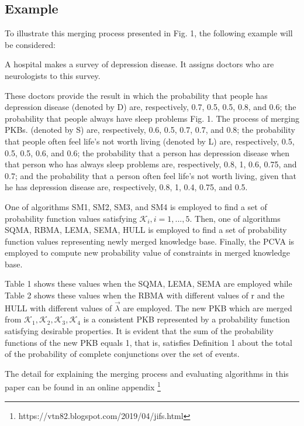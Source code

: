 \documentclass[]{iosart2c}
\begin{document}
\subsection{Example}

To illustrate this merging process presented in Fig. 1, the following example will be considered: 

A hospital makes a survey of depression disease. It assigns doctors who are neurologists to this survey. 

These doctors provide the result in which the probability that people has depression disease (denoted by D) are, respectively, 0.7, 0.5, 0.5, 0.8, and 0.6; the probability that people always have sleep problems Fig. 1. The process of merging PKBs.
(denoted by S) are, respectively, 0.6, 0.5, 0.7, 0.7, and 0.8; the probability that people often feel life’s not worth living (denoted by L) are, respectively, 0.5, 0.5, 0.5, 0.6, and 0.6; the probability that a person has depression disease when that person who has always sleep problems are, respectively, 0.8, 1, 0.6, 0.75, and 0.7; and the probability that a person often feel life’s not worth living, given that he has depression disease are, respectively, 0.8, 1, 0.4, 0.75, and 0.5. 

One of algorithms SM1, SM2, SM3, and SM4 is employed to find a set of probability function values satisfying $\mathcal{K}_i, i = 1, ..., 5$. Then, one of algorithms SQMA, RBMA, LEMA, SEMA, HULL is employed to find a set of probability function values representing newly merged knowledge base. Finally, the PCVA is employed to compute new probability value of constraints in merged knowledge base.

Table 1 shows these values when the SQMA, LEMA, SEMA are employed while Table 2 shows these values when the RBMA with different values of r and the HULL with different values of $\vec{\lambda}$ are employed. The new PKB which are merged from $\mathcal{K}_1,\mathcal{K}_2,\mathcal{K}_3,\mathcal{K}_4$ is a consistent PKB represented by a probability function satisfying desirable properties. It is evident that the sum of the probability functions of the new PKB equals 1, that is, satisfies Definition 1 about the total of the probability of complete conjunctions over the set of events. 

The detail for explaining the merging process and evaluating algorithms in this paper can be found in an online appendix \footnote{https://vtn82.blogspot.com/2019/04/jifs.html}
\end{document}
